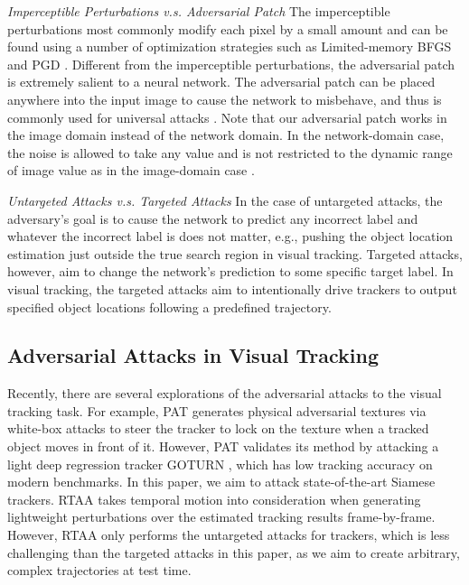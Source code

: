 \documentclass[journal]{IEEEtran}
\newcommand{\eg}{e.g.}
\begin{document}

\textit{Imperceptible Perturbations v.s. Adversarial Patch} The imperceptible perturbations most commonly modify each pixel by a small amount and can be found using a number of optimization strategies such as Limited-memory BFGS \cite{intriguing} and PGD \cite{PGD}.
Different from the imperceptible perturbations, the adversarial patch is extremely salient to a neural network. The adversarial patch can be placed anywhere into the input image to cause the network to misbehave, and thus is commonly used for universal attacks \cite{patch}.
Note that our adversarial patch works in the image domain instead of the network domain. In the network-domain case, the noise is allowed to take any value and is not restricted to the dynamic range of image value as in the image-domain case \cite{karmon2018lavan}.

\textit{Untargeted Attacks v.s. Targeted Attacks} In the case of untargeted attacks, the adversary's goal is to cause the network to predict any incorrect label and whatever the incorrect label is does not matter, \eg, pushing the object location estimation just outside the true search region in visual tracking.
Targeted attacks, however, aim to change the network's prediction to some specific target label. In visual tracking, the targeted attacks aim to intentionally drive trackers to output specified object locations following a predefined trajectory.

\subsection{Adversarial Attacks in Visual Tracking}

Recently, there are several explorations of the adversarial attacks to the visual tracking task. For example, PAT \cite{PAT} generates physical adversarial textures via white-box attacks to steer the tracker to lock on the texture when a tracked object moves in front of it. However, PAT validates its method by attacking a light deep regression tracker GOTURN \cite{GOTURN}, which has low tracking accuracy on modern benchmarks. In this paper, we aim to attack state-of-the-art Siamese trackers.
RTAA \cite{RTAA} takes temporal motion into consideration when generating lightweight perturbations over the estimated tracking results frame-by-frame. However, RTAA only performs the untargeted attacks for trackers, which is less challenging than the targeted attacks in this paper, as we aim to create arbitrary, complex trajectories at test time. 
\end{document}
